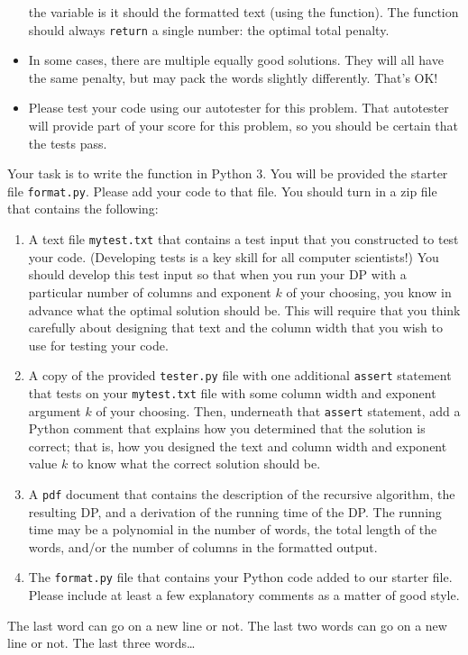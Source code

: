 \documentclass{ks-pset}
\begin{document}
\begin{problem}
\begin{itemize}
      the  variable is  it should  the
      formatted text (using the  function).  The function should
      always \texttt{return} a single number: the optimal total
      penalty.
    \item In some cases, there are multiple equally good solutions.  They will
      all have the same penalty, but may pack the words slightly differently.
      That's OK!
    \item Please test your code using our autotester for this problem. That
      autotester will provide part of your score for this problem, so you
      should be certain that the tests pass.
  \end{itemize}

  Your task is to write the  function in Python 3.  You will be
  provided the starter file \verb+format.py+.  Please add your code to that
  file. You should turn in a zip file that contains the following:
  \begin{enumerate}
    \item A text file \verb+mytest.txt+ that contains a test input that you
      constructed to test your code.  (Developing tests is a key skill for all
      computer scientists!)  You should develop this test input so that when
      you run your  DP with a particular number of columns and
      exponent \(k\) of your choosing, you know in advance what the optimal
      solution should be.  This will require that you think carefully about
      designing that text and the column width that you wish to use for testing
      your code.
    \item A copy of the provided \verb+tester.py+ file with one additional
      \texttt{assert} statement that tests on your
      \verb+mytest.txt+ file with some column width and exponent argument \(k\)
      of your choosing. Then, underneath that \texttt{assert}
      statement, add a Python comment that explains how you determined that the
      solution is correct; that is, how you designed the text and column width
      and exponent value \(k\) to know what the correct solution should be.
    \item A \verb+pdf+ document that contains the description of the recursive
      algorithm, the resulting DP, and a derivation of the running time of the
      DP. The running time may be a polynomial in the number of words, the
      total length of the words, and/or the number of columns in the formatted
      output.
    \item The \verb+format.py+ file  that contains your Python code added to
      our starter file.  Please include at least a few explanatory comments as
      a matter of good style.
  \end{enumerate}

  \begin{hint}
    The last word can go on a new line or not. The last two words can go on a
    new line or not. The last three words…
  \end{hint}

\end{problem}

\begin{solution}

\end{solution}
\end{document}
